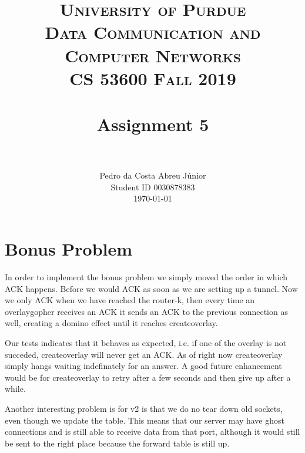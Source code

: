 \documentclass[paper=a4, fontsize=11pt]{scrartcl}
\title{
		\usefont{OT1}{bch}{b}{n}
		\normalfont \normalsize \textsc{University of Purdue\\
      Data Communication and Computer Networks\\
      CS 53600 Fall 2019} \\ [25pt]
		\horrule{0.5pt} \\[0.4cm]
		\huge Assignment 5\\
		\horrule{2pt} \\[0.5cm]
}
\author{
		\normalfont\normalsize Pedro da Costa Abreu Júnior\\ [-5pt]
    \normalsize Student ID 0030878383\\[-5pt]
    \normalsize \today
}
\date{}
\numberwithin{equation}{section}		%
\numberwithin{figure}{section}			%
\numberwithin{table}{section}				%
\begin{document}
\maketitle

\section*{Bonus Problem}
In order to implement the bonus problem we simply moved the order in which ACK happens.
Before we would ACK as soon as we are setting up a tunnel. Now we only ACK when we have reached the
router-k, then every time an overlaygopher receives an ACK it sends an ACK to the previous connection as well,
creating a domino effect until it reaches createoverlay.

Our tests indicates that it behaves as expected, i.e. if one of the overlay is not succeded, createoverlay
will never get an ACK. As of right now createoverlay simply hangs waiting indefinately for an answer. A good future enhancement
would be for createoverlay to retry after a few seconds and then give up after a while.

Another interesting problem is for v2 is that we do no tear down old sockets, even though we update the table.
This means that our server may have ghost connections and is still able to receive data from that port, although it would still
be sent to the right place because the forward table is still up.
\end{document}
